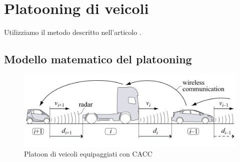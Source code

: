 \section{Platooning di veicoli}

Utilizziamo il metodo descritto nell'articolo \cite{ploeg_2014_lp}.


\subsection{Modello matematico del platooning}

\begin{figure}[H]
    \centering
    \captionsetup{justification=centering, margin=2cm}
    \includegraphics[width=\textwidth]{images/2-theory/PWN-CACC-equipped-vehicle-platoon.png}
    \caption{Platoon di veicoli equipaggiati con CACC}
    \label{fig:cacc-vehicle}
\end{figure}

\newpage
